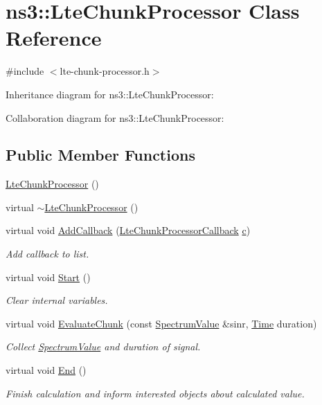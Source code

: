 \hypertarget{classns3_1_1LteChunkProcessor}{}\section{ns3\+:\+:Lte\+Chunk\+Processor Class Reference}
\label{classns3_1_1LteChunkProcessor}


{\ttfamily \#include $<$lte-\/chunk-\/processor.\+h$>$}



Inheritance diagram for ns3\+:\+:Lte\+Chunk\+Processor\+:


Collaboration diagram for ns3\+:\+:Lte\+Chunk\+Processor\+:
\subsection*{Public Member Functions}
\begin{DoxyCompactItemize}
\item 
\hyperlink{classns3_1_1LteChunkProcessor_ac2bf83e559c6605ad910b9b35fcbf753}{Lte\+Chunk\+Processor} ()
\item 
virtual \hyperlink{classns3_1_1LteChunkProcessor_a125ec1b0a8390d0b169ffeb29257c3fd}{$\sim$\+Lte\+Chunk\+Processor} ()
\item 
virtual void \hyperlink{classns3_1_1LteChunkProcessor_a122d4a00d72e68a0a8b2cbdd165cdfd8}{Add\+Callback} (\hyperlink{namespacens3_a1eefbcc1769adf9e530f2912bc946dd1}{Lte\+Chunk\+Processor\+Callback} \hyperlink{mmwave_2model_2fading-traces_2fading__trace__generator_8m_ae0323a9039add2978bf5b49550572c7c}{c})
\begin{DoxyCompactList}\small\item\em Add callback to list. \end{DoxyCompactList}\item 
virtual void \hyperlink{classns3_1_1LteChunkProcessor_a0874a0200c35d8747ed3531ff911e7cb}{Start} ()
\begin{DoxyCompactList}\small\item\em Clear internal variables. \end{DoxyCompactList}\item 
virtual void \hyperlink{classns3_1_1LteChunkProcessor_a8824858ef66b80bfa97c6059ca82822a}{Evaluate\+Chunk} (const \hyperlink{classns3_1_1SpectrumValue}{Spectrum\+Value} \&sinr, \hyperlink{classns3_1_1Time}{Time} duration)
\begin{DoxyCompactList}\small\item\em Collect \hyperlink{classns3_1_1SpectrumValue}{Spectrum\+Value} and duration of signal. \end{DoxyCompactList}\item 
virtual void \hyperlink{classns3_1_1LteChunkProcessor_af7076b3f60f2bea13890f7892277db62}{End} ()
\begin{DoxyCompactList}\small\item\em Finish calculation and inform interested objects about calculated value. \end{DoxyCompactList}\end{DoxyCompactItemize}

